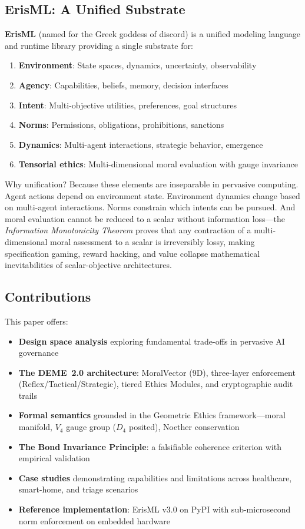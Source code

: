 \documentclass[conference]{IEEEtran}
\begin{document}
\subsection{ErisML: A Unified Substrate}

\textbf{ErisML} (named for the Greek goddess of discord) is a
unified modeling language and runtime library providing a single substrate for:

\begin{enumerate}
\item \textbf{Environment}: State spaces, dynamics, uncertainty, observability
\item \textbf{Agency}: Capabilities, beliefs, memory, decision interfaces
\item \textbf{Intent}: Multi-objective utilities, preferences, goal structures
\item \textbf{Norms}: Permissions, obligations, prohibitions, sanctions
\item \textbf{Dynamics}: Multi-agent interactions, strategic behavior, emergence
\item \textbf{Tensorial ethics}: Multi-dimensional moral evaluation with gauge invariance
\end{enumerate}

Why unification? Because these elements are inseparable in pervasive
computing. Agent actions depend on environment state. Environment
dynamics change based on multi-agent interactions. Norms constrain which
intents can be pursued. And moral evaluation cannot be reduced to a scalar without information loss---the \emph{Information Monotonicity Theorem} proves that any contraction of a multi-dimensional moral assessment to a scalar is irreversibly lossy, making specification gaming, reward hacking, and value collapse mathematical inevitabilities of scalar-objective architectures.

\subsection{Contributions}

This paper offers:
\begin{itemize}
\item \textbf{Design space analysis} exploring fundamental trade-offs in pervasive AI governance
\item \textbf{The DEME~2.0 architecture}: MoralVector (9D), three-layer enforcement (Reflex/Tactical/Strategic), tiered Ethics Modules, and cryptographic audit trails
\item \textbf{Formal semantics} grounded in the Geometric Ethics framework---moral manifold, $V_4$ gauge group ($D_4$ posited), Noether conservation
\item \textbf{The Bond Invariance Principle}: a falsifiable coherence criterion with empirical validation
\item \textbf{Case studies} demonstrating capabilities and limitations across healthcare, smart-home, and triage scenarios
\item \textbf{Reference implementation}: ErisML v3.0 on PyPI with sub-microsecond norm enforcement on embedded hardware
\end{itemize}
\end{document}
